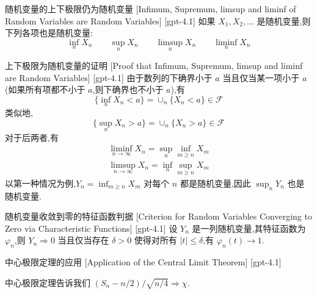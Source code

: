 \documentclass[UTF8]{ctexart}
\begin{document}
    
    
    \begin{thm}
        {随机变量的上下极限仍为随机变量}
        [Infimum, Supremum, limsup and liminf of Random Variables are Random Variables]
        [gpt-4.1]
        如果 $X_{1}, X_{2}, \dots$ 是随机变量,则下列各项也是随机变量:
\[
\inf_{n} X_{n} \qquad \sup_{n} X_{n} \qquad \limsup_{n} X_{n} \qquad \liminf_{n} X_{n}
\]

    \end{thm}
    
    
    
    \begin{prf}
        {上下极限为随机变量的证明}
        [Proof that Infimum, Supremum, limsup and liminf are Random Variables]
        [gpt-4.1]
        由于数列的下确界小于 $a$ 当且仅当某一项小于 $a$(如果所有项都不小于 $a$,则下确界也不小于 $a$),有
\[
\{ \inf_{n} X_{n} < a \} = \cup_{n} \{ X_{n} < a \} \in \mathcal{F}
\]
类似地,
\[
\{ \sup_{n} X_{n} > a \} = \cup_{n} \{ X_{n} > a \} \in \mathcal{F}
\]
对于后两者,有
\[
\begin{array}{c}
\liminf_{n \to \infty} X_{n} = \sup_{n} \inf_{m \geq n} X_{m} \\
\limsup_{n \to \infty} X_{n} = \inf_{n} \sup_{m \geq n} X_{m}
\end{array}
\]
以第一种情况为例,$Y_{n} = \inf_{m \geq n} X_{m}$ 对每个 $n$ 都是随机变量,因此 $\sup_{n} Y_{n}$ 也是随机变量.

    \end{prf}
    
    
    
    \begin{thm}
        {随机变量收敛到零的特征函数判据}
        [Criterion for Random Variables Converging to Zero via Characteristic Functions]
        [gpt-4.1]
        设 $Y_n$ 是一列随机变量,其特征函数为 $\varphi_n$,则 $Y_n \Rightarrow 0$ 当且仅当存在 $\delta > 0$ 使得对所有 $|t| \leq \delta$,有 $\varphi_n(t) \to 1$.
    \end{thm}
    
    
    
    \begin{thm}
        {中心极限定理的应用}
        [Application of the Central Limit Theorem]
        [gpt-4.1]
        
中心极限定理告诉我们 $(S_{n} - n/2) / \sqrt{n/4} \Rightarrow \chi$.

    \end{thm}
    
\end{document}
